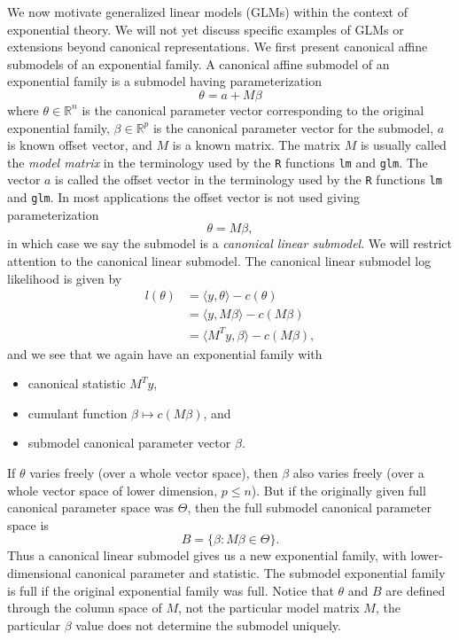 \documentclass[12pt]{article}
\newcommand{\R}{\mathbb{R}}
\newcommand{\inner}[1]{\langle #1 \rangle}
\begin{document}
We now motivate generalized linear models (GLMs) within the context of exponential theory. We will not yet discuss specific examples of GLMs or extensions beyond canonical representations. We first present canonical affine submodels of an exponential family. A canonical affine submodel of an exponential family is a submodel having parameterization
$$
  \theta = a + M\beta
$$
where $\theta \in \R^n$ is the canonical parameter vector corresponding to the original exponential family, $\beta \in \R^p$ is the canonical parameter vector for the submodel, $a$ is known offset vector, and $M$ is a known matrix. The matrix $M$ is usually called the \emph{model matrix} in the terminology used by the \texttt{R} functions \texttt{lm} and \texttt{glm}. The vector $a$ is called the offset vector in the terminology used by the \texttt{R} functions \texttt{lm} and \texttt{glm}. In most applications the offset vector is not used giving parameterization 
$$
  \theta = M\beta,
$$  
in which case we say the submodel is a \emph{canonical linear submodel}. We will restrict attention to the canonical linear submodel. The canonical linear submodel log likelihood is given by
\begin{equation} \label{subloglike}
\begin{split}
  l(\theta) &= \inner{y,\theta} - c(\theta) \\
    &= \inner{y,M\beta} - c(M\beta) \\
    &= \inner{M^Ty,\beta} - c(M\beta), 	
\end{split}
\end{equation}
and we see that we again have an exponential family with
\begin{itemize}
	\item canonical statistic $M^Ty$,
	\item cumulant function $\beta \mapsto c(M\beta)$, and 
	\item submodel canonical parameter vector $\beta$.
\end{itemize}
If $\theta$ varies freely (over a whole vector space), then $\beta$ also varies freely (over a whole vector space of lower dimension, $p \leq n$). But if the originally given full canonical parameter space was $\Theta$, then the full submodel canonical parameter space is 
$$
  B = \{\beta : M\beta \in \Theta\}.
$$
Thus a canonical linear submodel gives us a new exponential family, with lower-dimensional canonical parameter and statistic. The submodel exponential family is full if the original exponential family was full. Notice that $\theta$ and $B$ are defined through the column space of $M$, not the particular model matrix $M$, the particular $\beta$ value does not determine the submodel uniquely.
\end{document}
